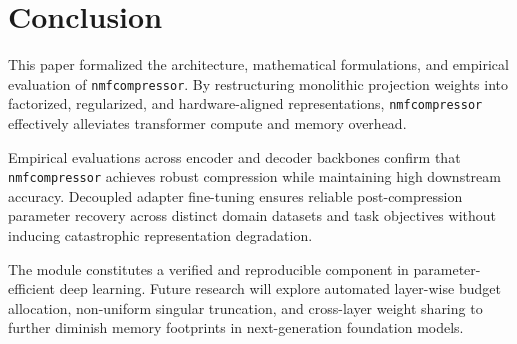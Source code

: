 \section{Conclusion}
This paper formalized the architecture, mathematical formulations, and empirical evaluation of \texttt{nmfcompressor}. By restructuring monolithic projection weights into factorized, regularized, and hardware-aligned representations, \texttt{nmfcompressor} effectively alleviates transformer compute and memory overhead.

Empirical evaluations across encoder and decoder backbones confirm that \texttt{nmfcompressor} achieves robust compression while maintaining high downstream accuracy. Decoupled adapter fine-tuning ensures reliable post-compression parameter recovery across distinct domain datasets and task objectives without inducing catastrophic representation degradation.

The module constitutes a verified and reproducible component in parameter-efficient deep learning. Future research will explore automated layer-wise budget allocation, non-uniform singular truncation, and cross-layer weight sharing to further diminish memory footprints in next-generation foundation models.
